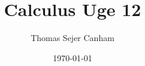 \documentclass{article}
\title{Calculus Uge 12}
\author{Thomas Sejer Canham}
\date{\today}
\begin{document}
\begin{titlepage}
 \maketitle
 \thispagestyle{empty}
\end{titlepage}
\end{document}
